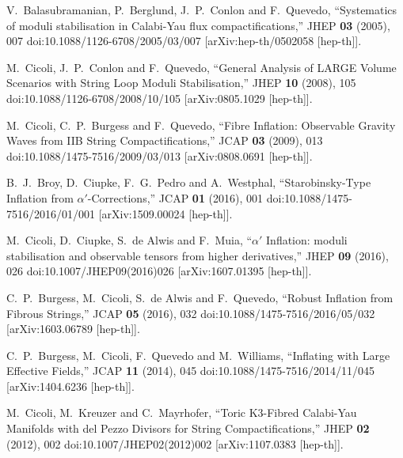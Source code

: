 \documentclass[aps,prd,a4paper,twocolumn,amsmath,showpacs,superscriptaddress,nofootinbib,preprintnumbers]{revtex4-1}
\begin{document}
\begin{thebibliography}{99}

V.~Balasubramanian, P.~Berglund, J.~P.~Conlon and F.~Quevedo,
``Systematics of moduli stabilisation in Calabi-Yau flux compactifications,''
JHEP \textbf{03} (2005), 007
doi:10.1088/1126-6708/2005/03/007
[arXiv:hep-th/0502058 [hep-th]].

M.~Cicoli, J.~P.~Conlon and F.~Quevedo,
``General Analysis of LARGE Volume Scenarios with String Loop Moduli Stabilisation,''
JHEP \textbf{10} (2008), 105
doi:10.1088/1126-6708/2008/10/105
[arXiv:0805.1029 [hep-th]].

M.~Cicoli, C.~P.~Burgess and F.~Quevedo,
``Fibre Inflation: Observable Gravity Waves from IIB String Compactifications,''
JCAP \textbf{03} (2009), 013
doi:10.1088/1475-7516/2009/03/013
[arXiv:0808.0691 [hep-th]].

B.~J.~Broy, D.~Ciupke, F.~G.~Pedro and A.~Westphal,
``Starobinsky-Type Inflation from $\alpha'$-Corrections,''
JCAP \textbf{01} (2016), 001
doi:10.1088/1475-7516/2016/01/001
[arXiv:1509.00024 [hep-th]].

M.~Cicoli, D.~Ciupke, S.~de Alwis and F.~Muia,
``$\alpha'$ Inflation: moduli stabilisation and observable tensors from higher derivatives,''
JHEP \textbf{09} (2016), 026
doi:10.1007/JHEP09(2016)026
[arXiv:1607.01395 [hep-th]].

C.~P.~Burgess, M.~Cicoli, S.~de Alwis and F.~Quevedo,
``Robust Inflation from Fibrous Strings,''
JCAP \textbf{05} (2016), 032
doi:10.1088/1475-7516/2016/05/032
[arXiv:1603.06789 [hep-th]].

C.~P.~Burgess, M.~Cicoli, F.~Quevedo and M.~Williams,
``Inflating with Large Effective Fields,''
JCAP \textbf{11} (2014), 045
doi:10.1088/1475-7516/2014/11/045
[arXiv:1404.6236 [hep-th]].

M.~Cicoli, M.~Kreuzer and C.~Mayrhofer,
``Toric K3-Fibred Calabi-Yau Manifolds with del Pezzo Divisors for String Compactifications,''
JHEP \textbf{02} (2012), 002
doi:10.1007/JHEP02(2012)002
[arXiv:1107.0383 [hep-th]].


\end{thebibliography}
\end{document}
